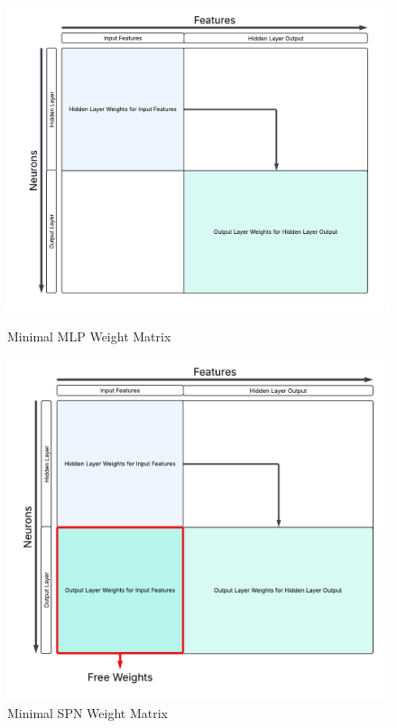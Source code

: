 \begin{figure}[H]
    \centering
    \begin{minipage}{0.45\textwidth}
        \centering
        \includegraphics[height=0.25\textheight, width=\linewidth]{Figures/Experiments/Minimal_MLP_weights.png} %
        \captionsetup{width=\linewidth}
        \caption{Minimal MLP Weight Matrix}
        \label{fig:minMLP}
    \end{minipage}\hfill
    \begin{minipage}{0.45\textwidth}
        \centering
        \includegraphics[height=0.25\textheight, width=\linewidth]{Figures/Experiments/Minimal_SPN_Weights.png} %
        \captionsetup{width=\linewidth}
        \caption{Minimal SPN Weight Matrix}
        \label{fig:minSPN}
    \end{minipage}
\end{figure}


